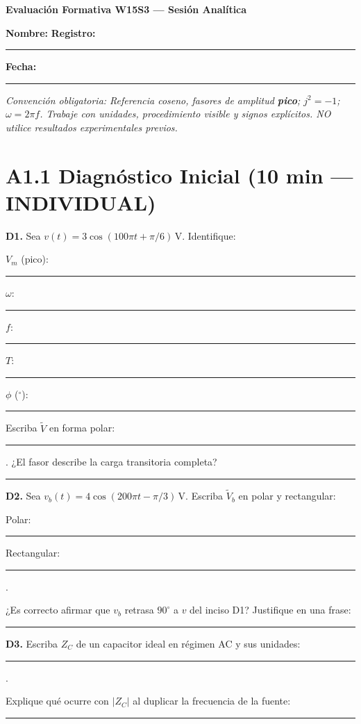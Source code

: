 \documentclass[11pt, a4paper]{article}
\begin{document}
\begin{tcolorbox}[colback=ucbblue!5!white, colframe=ucbblue, title=\textbf{Artefacto A1: Hoja de Taller EC4 — Del divisor fasorial al filtro RC}]
    \centering \textbf{Evaluación Formativa W15S3 — Sesión Analítica}
\end{tcolorbox}

\noindent\textbf{Nombre:} \hrulefill \quad \textbf{Registro:} \rule{2.5cm}{0.4pt} \quad \textbf{Fecha:} \rule{2.5cm}{0.4pt}

\vspace{0.1cm}
\noindent\textit{Convención obligatoria: Referencia coseno, fasores de amplitud \textbf{pico}; $j^2 = -1$; $\omega = 2\pi f$. Trabaje con unidades, procedimiento visible y signos explícitos. NO utilice resultados experimentales previos.}

\section*{A1.1 Diagnóstico Inicial (10 min — INDIVIDUAL)}
\textbf{D1.} Sea $v(t) = 3\cos(100\pi t + \pi/6)\,\text{V}$. Identifique: \par\vspace{0.1cm}
$V_m$ (pico): \rule{1.5cm}{0.4pt} \quad $\omega$: \rule{2cm}{0.4pt} \quad $f$: \rule{2cm}{0.4pt} \quad $T$: \rule{2cm}{0.4pt} \quad $\phi$ ($^\circ$): \rule{1.5cm}{0.4pt} \par\vspace{0.2cm}
Escriba $\tilde{V}$ en forma polar: \rule{3cm}{0.4pt}. ¿El fasor describe la carga transitoria completa? \rule{3cm}{0.4pt} \par\vspace{0.3cm}

\noindent\textbf{D2.} Sea $v_b(t) = 4\cos(200\pi t - \pi/3)\,\text{V}$. Escriba $\tilde{V}_b$ en polar y rectangular: \par\vspace{0.1cm}
Polar: \rule{3cm}{0.4pt} \quad Rectangular: \rule{4cm}{0.4pt}. \par\vspace{0.2cm}
¿Es correcto afirmar que $v_b$ retrasa $90^\circ$ a $v$ del inciso D1? Justifique en una frase: \par
\noindent\rule{\textwidth}{0.4pt} \par\vspace{0.3cm}

\noindent\textbf{D3.} Escriba $Z_C$ de un capacitor ideal en régimen AC y sus unidades: \rule{4cm}{0.4pt}. \par
Explique qué ocurre con $\vert{}Z_C\vert{}$ al duplicar la frecuencia de la fuente: \par
\noindent\rule{\textwidth}{0.4pt}
\end{document}
